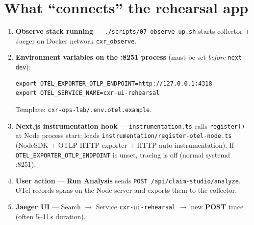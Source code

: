 \documentclass[11pt,a4paper]{report}
\begin{document}
\begin{center}
\end{center}

\section{What ``connects'' the rehearsal app}

\begin{enumerate}
  \item \textbf{Observe stack running} --- \texttt{./scripts/07-observe-up.sh} starts collector + Jaeger on Docker network \texttt{cxr\_observe}.
  \item \textbf{Environment variables on the :8251 process} (must be set \emph{before} \texttt{next dev}):
  \begin{lstlisting}[style=bash]
export OTEL_EXPORTER_OTLP_ENDPOINT=http://127.0.0.1:4318
export OTEL_SERVICE_NAME=cxr-ui-rehearsal
  \end{lstlisting}
  Template: \texttt{cxr-ops-lab/.env.otel.example}.
  \item \textbf{Next.js instrumentation hook} --- \texttt{instrumentation.ts} calls \texttt{register()} at Node process start;
  loads \texttt{instrumentation/register-otel-node.ts} (NodeSDK + OTLP HTTP exporter + HTTP auto-instrumentation).
  If \texttt{OTEL\_EXPORTER\_OTLP\_ENDPOINT} is unset, tracing is off (normal systemd :8251).
  \item \textbf{User action} --- \textbf{Run Analysis} sends \texttt{POST /api/claim-studio/analyze}.
  OTel records spans on the Node server and exports them to the collector.
  \item \textbf{Jaeger UI} --- Search $\rightarrow$ Service \texttt{cxr-ui-rehearsal} $\rightarrow$ new \textbf{POST} trace (often 5--11\,s duration).
\end{enumerate}
\end{document}
